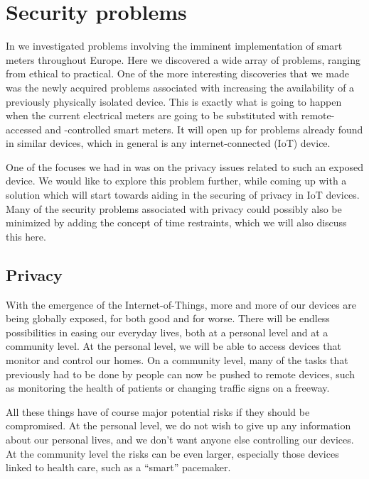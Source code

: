 
\section{Security problems}
In \cite{prespecialization} we investigated problems involving the imminent implementation of smart meters throughout Europe.
Here we discovered a wide array of problems, ranging from ethical to practical.
One of the more interesting discoveries that we made was the newly acquired problems associated with increasing the availability of a previously physically isolated device.
This is exactly what is going to happen when the current electrical meters are going to be substituted with remote-accessed and -controlled smart meters.
It will open up for problems already found in similar devices, which in general is any internet-connected (IoT) device.

One of the focuses we had in \cite{prespecialization} was on the privacy issues related to such an exposed device.
We would like to explore this problem further, while coming up with a solution which will start towards aiding in the securing of privacy in IoT devices.
Many of the security problems associated with privacy could possibly also be minimized by adding the concept of time restraints, which we will also discuss this here.

\subsection{Privacy}
With the emergence of the Internet-of-Things, more and more of our devices are being globally exposed, for both good and for worse.
There will be endless possibilities in easing our everyday lives, both at a personal level and at a community level.
At the personal level, we will be able to access devices that monitor and control our homes.
On a community level, many of the tasks that previously had to be done by people can now be pushed to remote devices, such as monitoring the health of patients or changing traffic signs on a freeway.

All these things have of course major potential risks if they should be compromised.
At the personal level, we do not wish to give up any information about our personal lives, and we don't want anyone else controlling our devices.
At the community level the risks can be even larger, especially those devices linked to health care, such as a ``smart'' pacemaker.

